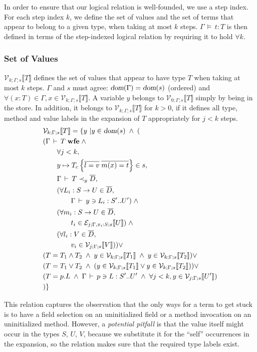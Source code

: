 \documentclass[9pt]{sigplanconf}
\newcommand{\gap}{\quad\quad}
\newcommand{\ts}{\,\vdash\,}
\newcommand{\dom}{\mbox{\sl dom}}
\newcommand{\expand}{\prec}
\newcommand{\typ}{:}
\newcommand{\wfe}{\;\mbox{\textbf{wfe}}}
\newcommand{\tand}{\wedge}
\newcommand{\tor}{\vee}
\newcommand{\ldefs}[1]{\left\{#1\right\}}
\newcommand{\seq}[1]{\overline{#1}}
\newcommand{\envplus}[1]{, #1}
\newcommand{\relv}[4]{\mathcal{V}_{#1;#2;#3}\llbracket#4\rrbracket}
\newcommand{\rele}[4]{\mathcal{E}_{#1;#2;#3}\llbracket#4\rrbracket}
\newcommand{\andl}{\;\wedge\;}
\newcommand{\orl}{\vee}
\newcommand{\ds}{\,\vDash\,}
\begin{document}
In order to ensure that our logical relation is well-founded, we use a
step index. For each step index $k$, we define the set of values and
the set of terms that appear to belong to a given type, when taking at
most $k$ steps. $\Gamma \ds t : T$ is then defined in terms of the
step-indexed logical relation by requiring it to hold $\forall k$.

\subsubsection{Set of Values}
$\relv k \Gamma s T$ defines the set of values that appear to have
type $T$ when taking at most $k$ steps. $\Gamma$ and $s$ must agree:
$\dom(\Gamma) = \dom(s)$ (ordered) and $\forall (x : T) \in \Gamma, x
\in \relv k \Gamma s T$. A variable $y$ belongs to $\relv 0 \Gamma s
T$ simply by being in the store. In addition, it belongs to $\relv k
\Gamma s T$ for $k > 0$, if it defines all type, method and value labels in
the expansion of $T$ appropriately for $j < k$ steps.
\begin{align*}
&\relv k \Gamma s T = \{ y \ | y \in \dom(s) \andl (\\
& (\Gamma \ts T \wfe \andl\\
&\gap \forall j < k,\\
&\gap y \mapsto T_c \ldefs{\seq{l = v}\;\seq{m(x)=t}} \in s,\\
&\gap \Gamma \ts T \expand_y \seq{D},\\
&\gap (\forall L_i : S \rightarrow U \in \seq{D},\\
&\gap\gap \Gamma \ts y \ni L_i \typ {S'..U'}) \andl\\
&\gap (\forall m_i : S \rightarrow U \in \seq{D},\\
&\gap\gap t_i \in \rele j {\Gamma \envplus{x_i : S}} s U) \andl\\
&\gap (\forall l_i : V \in \seq{D},\\
&\gap\gap v_i \in \relv j \Gamma s V)) \orl\\
& (T = T_1 \tand T_2 \andl y \in \relv k \Gamma s {T_1} \andl y \in \relv k \Gamma s {T_2}) \orl\\
& (T = T_1 \tor T_2 \andl  (y \in \relv k \Gamma s {T_1} \orl y \in \relv k \Gamma s {T_2})) \orl\\
& (T = p.L \andl \Gamma \ts p \ni L \typ {S'..U'} \andl \forall j < k, y \in \relv j \Gamma s {U'})\\
&)\}
\end{align*}

This relation captures the observation that the only ways for a term
to get stuck is to have a field selection on an uninitialized field or
a method invocation on an uninitialized method. However, a {\it potential
  pitfall} is that the value itself might occur in the types $S$, $U$,
$V$, because we substitute it for the ``self'' occurrences in the
expansion, so the relation makes sure that the required type labels exist.
\end{document}
